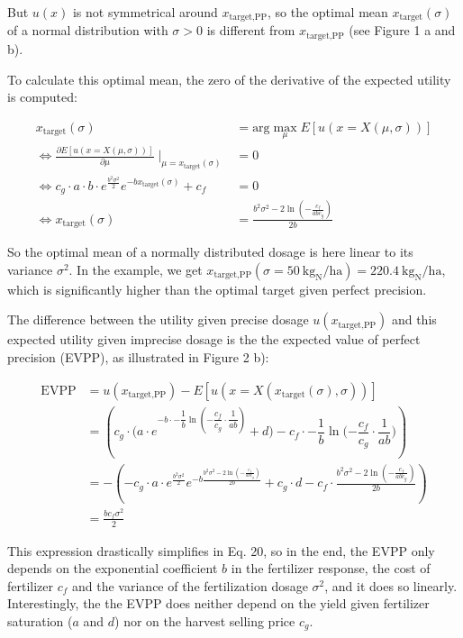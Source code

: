But $u(x)$ is not symmetrical around $x_\text{target,PP}$, so the optimal mean $x_\text{target}(\sigma)$ of a normal distribution with $\sigma > 0$ is different from $x_\text{target,PP}$ (see Figure 1 a and b).

To calculate this optimal mean, the zero of the derivative of the expected utility is computed:

\begin{align}
    x_\text{target}(\sigma) &= \text{arg}\max_{\mu} E[u(x=X(\mu, \sigma))] \\
    \iff \frac{\partial E[u(x=X(\mu, \sigma))]}{\partial \mu} \mid_{ \mu = x_\text{target}(\sigma)} &= 0 \\
    \iff  c_g \cdot a \cdot b \cdot e^{\frac{b^2 \sigma^2}{2}} e^{-b x_\text{target}(\sigma)} + c_f &= 0 \\
    \iff x_\text{target}(\sigma) &= \frac{b^2 \sigma^2 - 2 \ln\left(-\frac{c_f}{a b c_g}\right)}{2 b}
\end{align}

So the optimal mean of a normally distributed dosage is here linear to its variance $\sigma^2$. In the example, we get $x_\text{target,PP}(\sigma = 50 \ \text{kg}_\text{N} / \text{ha}) = 220.4 \ \text{kg}_\text{N} / \text{ha}$, which is significantly higher than the optimal target given perfect precision.

The difference between the utility given precise dosage $u(x_\text{target,PP})$ and this expected utility given imprecise dosage is the the expected value of perfect precision (EVPP), as illustrated in Figure 2 b):

\begin{align}
    \text{EVPP} &= u(x_\text{target,PP}) - E[u(x=X(x_\text{target}(\sigma), \sigma))] \\
    &= \left(c_g \cdot \Biggl(a \cdot e^{-b \cdot -\dfrac{1}{b} \ln(-\dfrac{c_f}{c_g}\cdot\dfrac{1}{ab})} + d) - c_f
    \cdot -\dfrac{1}{b} \ln(-\dfrac{c_f}{c_g}\cdot\dfrac{1}{ab}\Biggr)\right) \\
    &= - \left(- c_g \cdot a \cdot e^{\frac{b^2 \sigma^2}{2}} e^{-b \frac{b^2 \sigma^2 - 2 \ln\left(-\frac{c_f}{a b
    c_g}\right)}{2 b}} + c_g \cdot d - c_f \cdot \frac{b^2 \sigma^2 - 2 \ln\left(-\frac{c_f}{a b c_g}\right)}{2 b}\right) \\
    &= \frac{b c_{f} \sigma^{2}}{2}
\end{align}

This expression drastically simplifies in Eq. 20, so in the end, the EVPP only depends on the exponential coefficient $b$ in the fertilizer response, the cost of fertilizer $c_f$ and the variance of the fertilization dosage $\sigma^2$, and it does so linearly. Interestingly, the the EVPP does neither depend on the yield given fertilizer saturation ($a$ and $d$) nor on the harvest selling price $c_g$.

